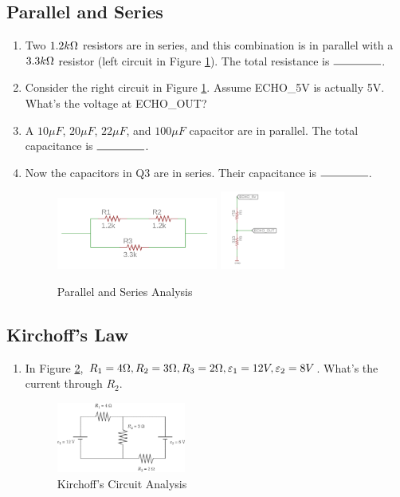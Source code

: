 \documentclass{article}
\newcommand{\ans}{$\rule{1.5cm}{0.15mm}$}
\begin{document}
\subsection{Parallel and Series}
\begin{enumerate}
	\item Two $1.2 k \ohm$ resistors are in series, and this combination is in parallel with a $3.3 k\ohm$ resistor (left circuit in Figure \ref{fig:parallel}). The total resistance is \ans.
	\item Consider the right circuit in Figure \ref{fig:parallel}. Assume ECHO\_5V is actually 5V. What's the voltage at ECHO\_OUT?
	\item A $10 \mu F$, $20 \mu F$, $22 \mu F$, and $100 \mu F$ capacitor are in parallel. The total capacitance is \ans.
	\item Now the capacitors in Q3 are in series. Their capacitance is \ans.
	
	\begin{figure}[h]
		\center
		\includegraphics[width=0.5\textwidth, keepaspectratio]{parallel}
		\includegraphics[width=0.2\textwidth, keepaspectratio]{vdivide}
		\caption{Parallel and Series Analysis}
		\label{fig:parallel}
	\end{figure}
	
	
\end{enumerate}
\subsection{Kirchoff's Law}
\begin{enumerate}
	\item In Figure \ref{fig:kirchof}, $R_1=4\ohm ,R_2=3\ohm,R_3=2\ohm, \varepsilon_1=12V, \varepsilon_2=8V$. What's the current through $ R_2 $.
	\begin{figure}[!h]
		\center
		\includegraphics[width=0.4\textwidth, keepaspectratio]{kirchof}
		\caption{Kirchoff's Circuit Analysis}
		\label{fig:kirchof}
	\end{figure}
\end{enumerate}
\clearpage
\end{document}
